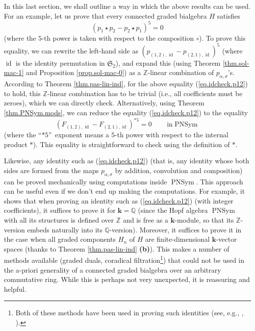 \documentclass[numbers=enddot,12pt,final,onecolumn,notitlepage]{scrartcl}%
\theoremstyle{definition}
\begin{document}
In this last section, we shall outline a way in which the above results can be
used. For an example, let us prove that every connected graded bialgebra $H$
satisfies%
\begin{equation}
\left(  p_{1}\star p_{2}-p_{2}\star p_{1}\right)  ^{5}=0
\label{eq.idcheck.p12}%
\end{equation}
(where the $5$-th power is taken with respect to the composition $\circ$). To
prove this equality, we can rewrite the left-hand side as $\left(  p_{\left(
1,2\right)  ,\operatorname*{id}}-p_{\left(  2,1\right)  ,\operatorname*{id}%
}\right)  ^{5}$ (where $\operatorname*{id}$ is the identity permutation in
$\mathfrak{S}_{2}$), and expand this (using Theorem \ref{thm.sol-mac-1} and
Proposition \ref{prop.sol-mac-0}) as a $\mathbb{Z}$-linear combination of
$p_{\alpha,\sigma}$'s. According to Theorem \ref{thm.pas-lin-ind}, for the
above equality (\ref{eq.idcheck.p12}) to hold, this $\mathbb{Z}$-linear
combination has to be trivial (i.e., all coefficients must be zeroes), which
we can directly check. Alternatively, using Theorem \ref{thm.PNSym.mods}, we
can reduce the equality (\ref{eq.idcheck.p12}) to the equality%
\[
\left(  F_{\left(  1,2\right)  ,\operatorname*{id}}-F_{\left(  2,1\right)
,\operatorname*{id}}\right)  ^{\ast5}=0\ \ \ \ \ \ \ \ \ \ \text{in
}\operatorname*{PNSym}%
\]
(where the \textquotedblleft$\ast5$\textquotedblright\ exponent means a $5$-th
power with respect to the internal product $\ast$). This equality is
straightforward to check using the definition of $\ast$.

Likewise, any identity such as (\ref{eq.idcheck.p12}) (that is, any identity
whose both sides are formed from the maps $p_{\alpha,\sigma}$ by addition,
convolution and composition) can be proved mechanically using computations
inside $\operatorname*{PNSym}$. This approach can be useful even if we don't
end up making the computations. For example, it shows that when proving an
identity such as (\ref{eq.idcheck.p12}) (with integer coefficients), it
suffices to prove it for $\mathbf{k}=\mathbb{Q}$ (since the Hopf algebra
$\operatorname*{PNSym}$ with all its structures is defined over $\mathbb{Z}$
and is free as a $\mathbf{k}$-module, so that its $\mathbb{Z}$-version embeds
naturally into its $\mathbb{Q}$-version). Moreover, it suffices to prove it in
the case when all graded components $H_{n}$ of $H$ are finite-dimensional
$\mathbf{k}$-vector spaces (thanks to Theorem \ref{thm.pas-lin-ind}
\textbf{(b)}). This makes a number of methods available (graded duals,
coradical filtration\footnote{Both of these methods have been used in proving
such identities (see, e.g., \cite{AguLau14}, \cite[\S 3]{Pang18}).}) that
could not be used in the a-priori generality of a connected graded bialgebra
over an arbitrary commutative ring. While this is perhaps not very unexpected,
it is reassuring and helpful.
\end{document}
